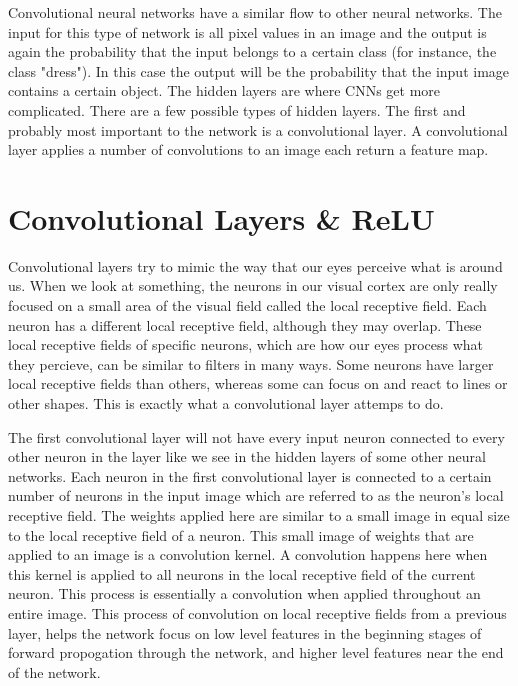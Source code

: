 \documentclass[12pt]{report} %
\begin{document}
	Convolutional neural networks have a similar flow to other neural networks. The input for this type of network is all pixel values in an image and the output is again the probability that the input belongs to a certain class (for instance, the class "dress"). In this case the output will be the probability that the input image contains a certain object. The hidden layers are where CNNs get more complicated. There are a few possible types of hidden layers. The first and probably most important to the network is a convolutional layer. A convolutional layer applies a number of convolutions to an image each return a feature map\cite{aurelienMachineLearning}. 

\section{Convolutional Layers \& ReLU}
	
	Convolutional layers try to mimic the way that our eyes perceive what is around us. When we look at something, the neurons in our visual cortex are only really focused on a small area of the visual field called the local receptive field. Each neuron has a different local receptive field, although they may overlap. These local receptive fields of specific neurons, which are how our eyes process what they percieve, can be similar to filters in many ways. Some neurons have larger local receptive fields than others, whereas some can focus on and react to lines or other shapes. This is exactly what a convolutional layer attemps to do.\cite{aurelienMachineLearning} 
	
	The first convolutional layer will not have every input neuron connected to every other neuron in the layer like we see in the hidden layers of some other neural networks. Each neuron in the first convolutional layer is connected to a certain number of neurons in the input image which are referred to as the neuron's local receptive field. The weights applied here are similar to a small image in equal size to the local receptive field of a neuron. This small image of weights that are applied to an image is a convolution kernel. A convolution happens here when this kernel is applied to all neurons in the local receptive field of the current neuron. This process is essentially a convolution when applied throughout an entire image. This process of convolution on local receptive fields from a previous layer, helps the network focus on low level features in the beginning stages of forward propogation through the network, and higher level features near the end of the network.\cite{aurelienMachineLearning} 
	
\end{document}

